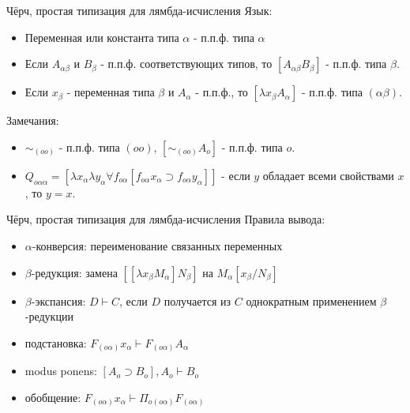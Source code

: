 \documentclass{beamer}
\begin{document}
\begin{frame}{Чёрч, простая типизация для лямбда-исчисления}
Язык:\\
\bigskip
\begin{itemize}
  \item Переменная или константа типа $\alpha$ - п.п.ф. типа $\alpha$ 
  \item Если $A_{\alpha\beta}$ и $B_{\beta}$ - п.п.ф. соответствующих типов, то $[A_{\alpha\beta}B_\beta]$ - п.п.ф. типа $\beta$.
  \item Если $x_\beta$ - переменная типа $\beta$ и $A_\alpha$ - п.п.ф., то $[\lambda x_\beta A_\alpha]$ - п.п.ф. типа $(\alpha \beta)$.
\end{itemize}
\bigskip
Замечания:\\
\begin{itemize}
  \item $\sim_{(oo)}$ - п.п.ф. типа $(oo)$, $[\sim_{(oo)}A_o]$ - п.п.ф. типа $o$.
  \item $Q_{o \alpha \alpha} = [\lambda x_\alpha \lambda y_\alpha \forall f_{o \alpha}[f_{o \alpha} x_\alpha \supset f_{o \alpha} y_\alpha]]$ - если $y$ обладает всеми свойствами $x$, то $y = x$.
\end{itemize}
\end{frame}

\begin{frame}{Чёрч, простая типизация для лямбда-исчисления}
Правила вывода:\\
\bigskip
\begin{itemize}
  \item $\alpha$-конверсия: переименование связанных переменных
  \item $\beta$-редукция: замена $[[\lambda x_\beta M_\alpha] N_\beta]$ на $M_\alpha[x_\beta/N_\beta]$
  \item $\beta$-экспансия: $D \vdash C$, если $D$ получается из $C$ однократным применением $\beta$-редукции
  \item подстановка: $F_{(o \alpha)} x_\alpha \vdash F_{(o \alpha)} A_\alpha$
  \item modus ponens: $[A_o \supset B_o], A_o \vdash B_o$ 
  \item обобщение: $F_{(o \alpha)} x_\alpha \vdash \Pi_{o (o \alpha)} F_{(o \alpha)}$
\end{itemize}
\end{frame}
\end{document}
